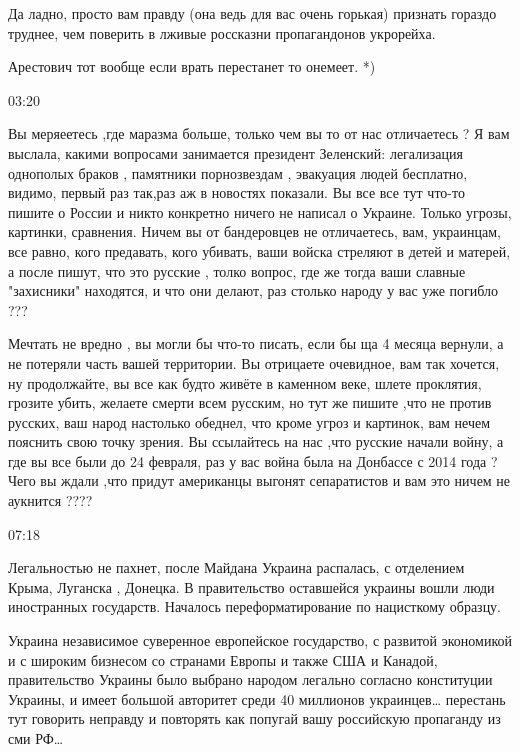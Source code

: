 
Да ладно, просто вам правду (она ведь для вас очень горькая) признать гораздо
труднее, чем поверить в лживые россказни пропагандонов укрорейха.

Арестович тот вообще если врать перестанет то онемеет. *)

03:20

Вы меряеетесь ,где маразма больше, только чем вы то от нас отличаетесь ? Я вам
выслала, какими вопросами занимается президент Зеленский: легализация однополых
браков , памятники порнозвездам , эвакуация людей бесплатно,  видимо, первый
раз так,раз аж в новостях показали. Вы все все тут что-то пишите о России и
никто конкретно ничего не написал о Украине.  Только угрозы, картинки,
сравнения.  Ничем вы от бандеровцев не отличаетесь, вам, украинцам, все равно,
кого предавать, кого убивать, ваши войска стреляют в детей и матерей, а после
пишут, что это русские , толко вопрос, где же тогда ваши славные "захисники"
находятся, и что они делают, раз столько народу у вас уже погибло ???


Мечтать не вредно , вы могли бы что-то писать, если бы ща 4 месяца вернули, а
не потеряли часть вашей территории. Вы отрицаете очевидное, вам так хочется, ну
продолжайте, вы все как будто живёте в каменном веке, шлете проклятия, грозите
убить, желаете смерти всем русским, но тут же пишите ,что не против русских,
ваш народ настолько обеднел, что кроме угроз и картинок, вам нечем пояснить
свою точку зрения. Вы ссылайтесь на нас ,что русские начали войну, а где вы все
были до 24 февраля, раз у вас война была на Донбассе с 2014 года ? Чего вы
ждали ,что придут американцы выгонят сепаратистов и вам это ничем не аукнится
????

07:18

Легальностью не пахнет, после Майдана Украина распалась, с отделением Крыма,
Луганска , Донецка. В правительство оставшейся украины вошли люди иностранных
государств. Началось переформатирование по нацисткому образцу.


Украина независимое суверенное европейское государство, с развитой экономикой и
с широким бизнесом со странами Европы и также США и Канадой, правительство
Украины было выбрано народом легально согласно конституции Украины, и имеет
большой авторитет среди 40 миллионов украинцев… перестань тут говорить неправду
и повторять как попугай вашу российскую пропаганду из сми РФ…

